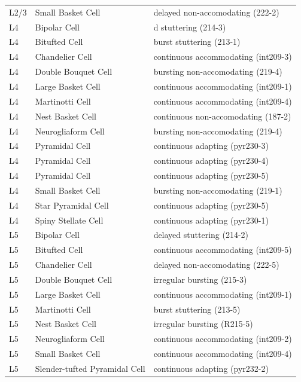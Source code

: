 \begin{longtable}{lll}
L2/3   &    Small Basket Cell  &   delayed non-accomodating (222-2)    \\
L4 &   Bipolar Cell    &   d stuttering (214-3)    \\
L4 &   Bitufted Cell   &   burst stuttering (213-1)    \\
L4 &   Chandelier Cell &   continuous accommodating (int209-3) \\
L4 &   Double Bouquet Cell &   bursting non-accomodating (219-4)   \\
L4 &   Large Basket Cell   &   continuous accommodating (int209-1) \\
L4 &   Martinotti Cell &   continuous accommodating (int209-4) \\
L4 &   Nest Basket Cell    &   continuous non-accomodating (187-2) \\
L4 &   Neurogliaform Cell  &   bursting non-accomodating (219-4)   \\
L4 &   Pyramidal Cell  &   continuous adapting (pyr230-3)  \\
L4 &   Pyramidal Cell  &   continuous adapting (pyr230-4)  \\
L4 &   Pyramidal Cell  &   continuous adapting (pyr230-5)  \\
L4 &   Small Basket Cell   &   bursting non-accomodating (219-1)   \\
L4 &   Star Pyramidal Cell &   continuous adapting (pyr230-5)  \\
L4 &   Spiny Stellate Cell &   continuous adapting (pyr230-1)  \\
L5 &   Bipolar Cell    &   delayed stuttering (214-2)  \\
L5 &   Bitufted Cell   &   continuous accommodating (int209-5) \\
L5 &   Chandelier Cell &   delayed non-accomodating (222-5)    \\
L5 &   Double Bouquet Cell &   irregular bursting (215-3)  \\
L5 &   Large Basket Cell   &   continuous accommodating (int209-1) \\
L5 &   Martinotti Cell &   burst stuttering (213-5)    \\
L5 &   Nest Basket Cell    &   irregular bursting (R215-5) \\
L5 &   Neurogliaform Cell  &   continuous accommodating (int209-2) \\
L5 &   Small Basket Cell   &   continuous accommodating (int209-4) \\
L5 &   Slender-tufted Pyramidal Cell   &   continuous adapting (pyr232-2)  \\

\end{longtable}
